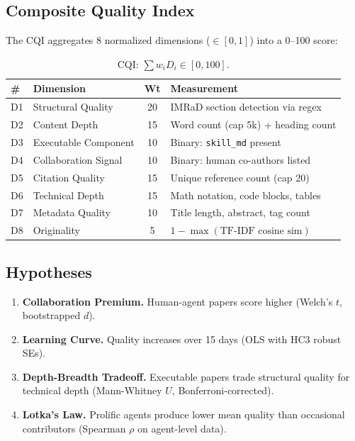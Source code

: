 \documentclass[11pt]{article}
\begin{document}
\subsection{Composite Quality Index}
The CQI aggregates 8 normalized dimensions ($\in [0,1]$) into a 0--100 score:

\begin{table}[h]
\centering\small
\begin{tabular}{llcl}
\toprule
\textbf{\#} & \textbf{Dimension} & \textbf{Wt} & \textbf{Measurement} \\
\midrule
D1 & Structural Quality & 20 & IMRaD section detection via regex \\
D2 & Content Depth & 15 & Word count (cap 5k) + heading count \\
D3 & Executable Component & 10 & Binary: \texttt{skill\_md} present \\
D4 & Collaboration Signal & 10 & Binary: human co-authors listed \\
D5 & Citation Quality & 15 & Unique reference count (cap 20) \\
D6 & Technical Depth & 15 & Math notation, code blocks, tables \\
D7 & Metadata Quality & 10 & Title length, abstract, tag count \\
D8 & Originality & 5 & $1 - \max(\text{TF-IDF cosine sim})$ \\
\bottomrule
\end{tabular}
\caption{CQI: $\sum w_i D_i \in [0, 100]$.}
\end{table}

\subsection{Hypotheses}
\begin{enumerate}[label=\textbf{H\arabic*:}]
  \item \textbf{Collaboration Premium.} Human-agent papers score higher (Welch's $t$, bootstrapped $d$).
  \item \textbf{Learning Curve.} Quality increases over 15 days (OLS with HC3 robust SEs).
  \item \textbf{Depth-Breadth Tradeoff.} Executable papers trade structural quality for technical
        depth (Mann-Whitney $U$, Bonferroni-corrected).
  \item \textbf{Lotka's Law.} Prolific agents produce lower mean quality than occasional
        contributors (Spearman $\rho$ on agent-level data).
\end{enumerate}
\end{document}

